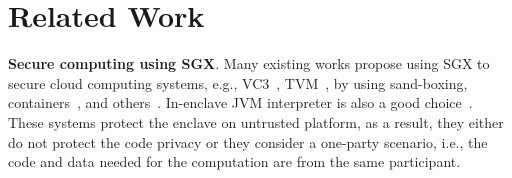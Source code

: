\section{Related Work}\label{sec-relatedwork}

\vspace{3pt}\noindent\textbf{Secure computing using SGX}.
Many existing works propose using SGX to secure cloud computing systems, e.g., VC3~\cite{schuster2015vc3}, TVM~\cite{hynes2018efficient}, by using 
sand-boxing, containers~\cite{tian2019practical}, and others~\cite{shinde2017panoply,shanker2020evaluation}. 
In-enclave JVM interpreter is also a good choice~\cite{jiang2020uranus}. These systems protect the enclave on untrusted platform, as a result, they either do not protect the code privacy or they consider a one-party scenario, i.e., the code and data needed for the computation are from the same participant. 

